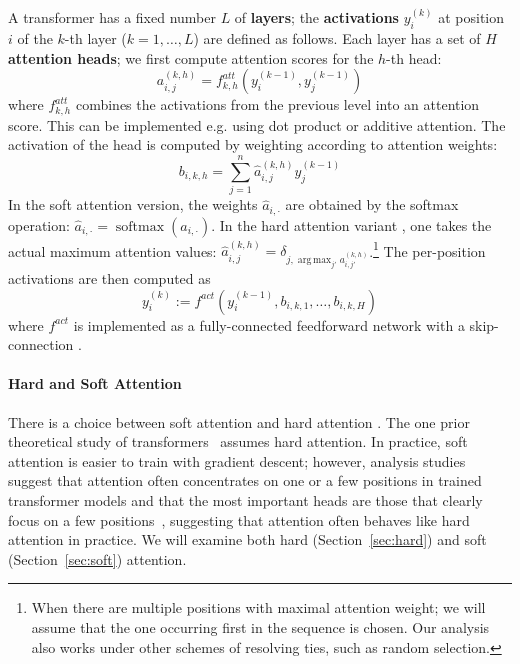 \documentclass[11pt,a4paper]{article}
\DeclareMathOperator*{\argmax}{arg\,max}
\newcommand{\key}[1]{\textbf{#1}}
\begin{document}
A transformer has a fixed number $L$ of \key{layers}; the \key{activations} $y_i^{(k)}$ at position $i$ of the $k$-th layer ($k=1, \dots, L$) are defined as follows.
Each layer has a set of $H$ \key{attention heads}; we first compute attention scores for the $h$-th head:
\begin{equation}
    a_{i,j}^{(k,h)} = f^{att}_{k,h}\left(y_i^{(k-1)}, y_j^{(k-1)}\right)
\end{equation}
where $f^{att}_{k,h}$ combines the activations from the previous level into an attention score.
This can be implemented e.g. using dot product or additive attention.
The  activation of the head is computed by weighting according to attention weights:
\begin{equation}
    b_{i,k,h} = \sum_{j=1}^n \hat{a}_{i,j}^{(k,h)} y_j^{(k-1)}
\end{equation}
In the soft attention version, the weights $\hat{a}_{i,\cdot}$ are obtained by the softmax operation: $\hat{a}_{i,\cdot} = \operatorname{softmax}(a_{i,\cdot})$.
In the hard attention variant \cite{perez2019turing}, one takes the actual maximum attention values:
$\hat{a}_{i,j}^{(k,h)} = \delta_{j, \argmax_{j'} a_{i,j'}^{(k,h)}}$.\footnote{When there are multiple positions with maximal attention weight; we will assume that the one occurring first in the sequence is chosen. Our analysis also works under other schemes of resolving ties, such as random selection.}
The  per-position activations are then computed as
\begin{equation}
    y_i^{(k)} := f^{act}(y_i^{(k-1)}, b_{i,k,1}, \dots, b_{i,k,H})
\end{equation}
where $f^{act}$ is implemented as a fully-connected feedforward network with a skip-connection \cite{vaswani2017attention}.

\paragraph{Hard and Soft Attention}
There is a choice between soft attention and hard attention \cite{shen2018reinforced,perez2019turing}.
The one prior theoretical study of transformers~\cite{perez2019turing} assumes hard attention.
In practice, soft attention is easier to train with gradient descent; however, analysis studies suggest that attention often concentrates on one or a few positions in trained transformer models \cite{voita2019analyzing,clark2019bert} and that the most important heads are those that clearly focus on a few positions~\cite{voita2019analyzing}, suggesting that attention often behaves  like hard attention in practice. %
We will  examine both hard (Section~\ref{sec:hard}) and soft (Section~\ref{sec:soft}) attention.
\end{document}
